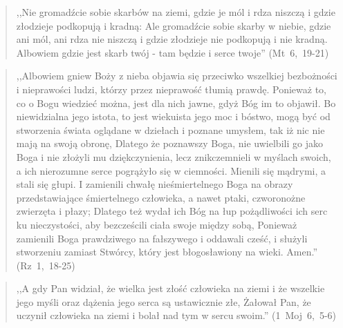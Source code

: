 \documentclass[10pt,a4paper,oneside]{article}
\begin{document}
\begin{quote}
,,Nie gromadźcie sobie skarbów na ziemi, gdzie je mól i rdza niszczą i gdzie złodzieje podkopują i kradną: Ale gromadźcie sobie skarby w niebie, gdzie ani mól, ani rdza nie niszczą i gdzie złodzieje nie podkopują i nie kradną. Albowiem gdzie jest skarb twój - tam będzie i serce twoje'' \mbox{(Mt 6, 19-21)}
\end{quote}
\begin{quote}
,,Albowiem gniew Boży z nieba objawia się przeciwko wszelkiej bezbożności i nieprawości ludzi, którzy przez nieprawość tłumią prawdę. Ponieważ to, co o Bogu wiedzieć można, jest dla nich jawne, gdyż Bóg im to objawił. Bo niewidzialna jego istota, to jest wiekuista jego moc i bóstwo, mogą być od stworzenia świata oglądane w dziełach i poznane umysłem, tak iż nic nie mają na swoją obronę, Dlatego że poznawszy Boga, nie uwielbili go jako Boga i nie złożyli mu dziękczynienia, lecz znikczemnieli w myślach swoich, a ich nierozumne serce pogrążyło się w ciemności. Mienili się mądrymi, a stali się głupi. I zamienili chwałę nieśmiertelnego Boga na obrazy przedstawiające śmiertelnego człowieka, a nawet ptaki, czworonożne zwierzęta i płazy; Dlatego też wydał ich Bóg na łup pożądliwości ich serc ku nieczystości, aby bezcześcili ciała swoje między sobą, Ponieważ zamienili Boga prawdziwego na fałszywego i oddawali cześć, i służyli stworzeniu zamiast Stwórcy, który jest błogosławiony na wieki. Amen.'' \mbox{(Rz 1, 18-25)}
\end{quote}
\begin{quote}
,,A gdy Pan widział, że wielka jest złość człowieka na ziemi i że wszelkie jego myśli oraz dążenia jego serca są ustawicznie złe, Żałował Pan, że uczynił człowieka na ziemi i bolał nad tym w sercu swoim.'' \mbox{(1 Moj 6, 5-6)}
\end{quote}
\end{document}
